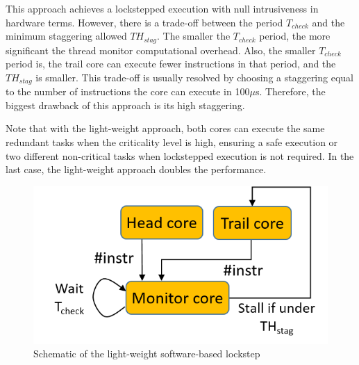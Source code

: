 This approach achieves a lockstepped execution with null intrusiveness in hardware terms. However, there is a trade-off between the period $T_{check}$ and the minimum staggering allowed $TH_{stag}$. The smaller the $T_{check}$ period, the more significant the thread monitor computational overhead. Also, the smaller $T_{check}$ period is, the trail core can execute fewer instructions in that period, and the $TH_{stag}$ is smaller. This trade-off is usually resolved by choosing a staggering equal to the number of instructions the core can execute in 100$\mu$s. Therefore, the biggest drawback of this approach is its high staggering.

Note that with the light-weight approach, both cores can execute the same redundant tasks when the criticality level is high, ensuring a safe execution or two different non-critical tasks when lockstepped execution is not required. In the last case, the light-weight approach doubles the performance.

\begin{figure}[h]
    \centering
    \includegraphics[scale=1]{img/SWlockstep.png}
    \caption{Schematic of the light-weight software-based lockstep}
    \label{fig:SWlockstep}
\end{figure}

\bigskip


